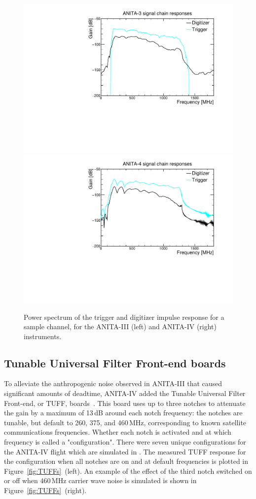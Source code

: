 \begin{figure}[!h]\centering
  \includegraphics[width=.45\linewidth]{./Figs/A3ImpulseResponses.pdf}
  \includegraphics[width=.45\linewidth]{./Figs/A4ImpulseResponses.pdf}
  \caption{Power spectrum of the trigger and digitizer impulse
    response for a sample channel, for the ANITA-III (left) and ANITA-IV (right) instruments. 
    }
  \label{fig:ANITA_ImpulseResponses}
\end{figure}


\subsection{Tunable Universal Filter Front-end boards}
\label{subsec:tuffs}
To alleviate the anthropogenic noise observed in ANITA-III that caused
significant amounts of deadtime, ANITA-IV added the Tunable Universal
Filter Front-end, or TUFF, boards~\cite{Allison:2017vtk}.
This board uses up to three notches to attenuate
the gain by a maximum of 13\,dB around each notch
frequency:
the notches are tunable, but default to 260, 375, and 460\,MHz, corresponding to known satellite communications frequencies. 
Whether each notch is activated and at which frequency is called
a "configuration".
There were seven unique configurations for the ANITA-IV flight  which are simulated in 
\icemc. 
The measured TUFF response for the configuration when all notches are on and at default frequencies is plotted in Figure~\ref{fig:TUFFs}~(left). 
An example of the effect of the third notch switched on or off when 460\,MHz carrier wave noise is simulated is shown in Figure~\ref{fig:TUFFs}~(right).

